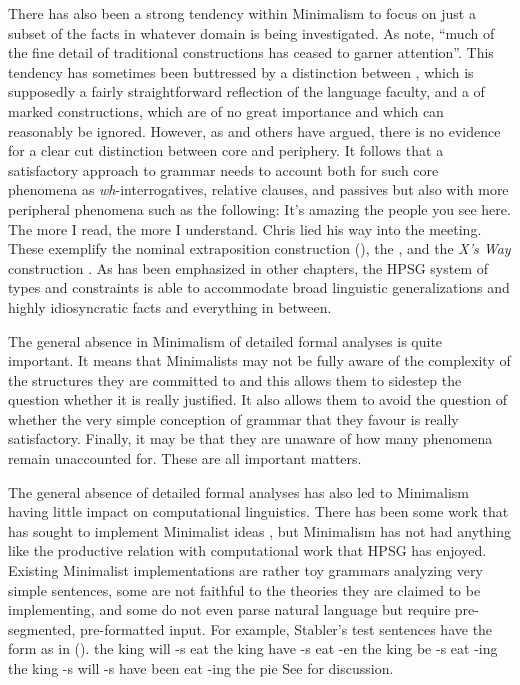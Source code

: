 \documentclass[output=paper]{langsci/langscibook}
\begin{document}
There has also been a strong tendency within Minimalism to focus on just a subset of the facts in
whatever domain is being investigated. As \citet[535]{CJ2005a} note, ``much of the fine detail of
traditional constructions has ceased to garner attention''. This tendency has sometimes been
buttressed by a distinction between , which is supposedly a fairly straightforward
reflection of the language faculty, and a  of marked constructions, which are of no great
importance and which can reasonably be ignored. However, as \citet{Culicover99a-u} and others have
argued, there is no evidence for a clear cut distinction between core and periphery. It follows that
a satisfactory approach to grammar needs to account both for such core phenomena as
\emph{wh}-interrogatives, relative clauses, and passives but also with more peripheral phenomena
such as the following: 
\eal
\ex It's amazing the people you see here.\label{ex:min-amazing-people}
\ex The more I read, the more I understand.\label{ex:min-read-understand}
\ex Chris lied his way into the meeting.\label{ex:min-chris-meeting}
\zl 
These exemplify the nominal extraposition construction (\citealt{ML96a}), the  \citep{CJ99a-u,Borsley2011a-u}, and
the \emph{X's Way} construction \citep{Salkoff88a-u,Sag2012a}. As has been emphasized in other
chapters, the HPSG system of types and constraints is able to accommodate broad linguistic
generalizations and highly idiosyncratic facts and everything in between. 

The general absence in Minimalism of detailed formal analyses is quite important. It means that
Minimalists may not be fully aware of the complexity of the structures they are committed to and
this allows them to sidestep the question whether it is really justified. It also allows them to avoid
the question of whether the very simple conception of grammar that they favour is really
satisfactory. Finally, it may be that they are unaware of how many phenomena remain unaccounted
for. These are all important matters.  

The general absence of detailed formal analyses has also led to Minimalism having little impact on
computational linguistics. There has been some work that has sought to implement Minimalist ideas
\citep{Stabler2001a,FG2012a,Fong2014a}, but Minimalism has not had anything like the productive
relation with computational work that HPSG has enjoyed. Existing Minimalist implementations are rather toy
grammars analyzing very simple sentences, some are not faithful to the theories they are claimed to
be implementing, and some do not even parse natural language but require pre-segmented, pre-formatted
input. For example, Stabler's test sentences have the form as in ().
\eal
\ex the king will -s eat
\ex the king have -s eat -en
\ex the king be -s eat -ing
\ex the king -s will -s have been eat -ing the pie
\zl
See \citet[Section~4.7.2]{MuellerGT-Eng1} for discussion.
\end{document}
